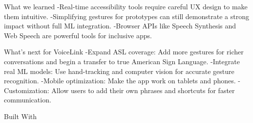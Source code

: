 What we learned
-Real-time accessibility tools require careful UX design to make them intuitive. -Simplifying gestures for prototypes can still demonstrate a strong impact without full ML integration. -Browser APIs like Speech Synthesis and Web Speech are powerful tools for inclusive apps.

What's next for VoiceLink
-Expand ASL coverage: Add more gestures for richer conversations and begin a transfer to true American Sign Language. -Integrate real ML models: Use hand-tracking and computer vision for accurate gesture recognition. -Mobile optimization: Make the app work on tablets and phones. -Customization: Allow users to add their own phrases and shortcuts for faster communication.

Built With

